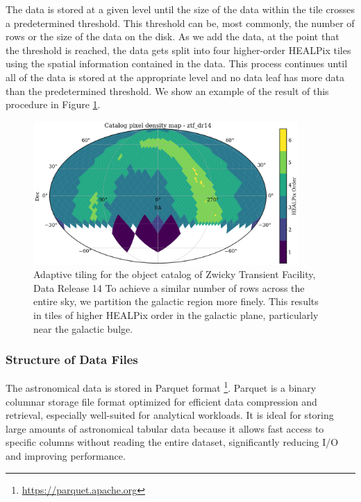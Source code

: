 \documentclass[11pt,a4paper]{ivoa}
\begin{document}
The data is stored at a given level until the size of the data within the tile crosses a predetermined threshold. 
This threshold can be, most commonly, the number of rows or the size of the data on the disk. 
As we add the data, at the point that the threshold is reached, the data gets split into four higher-order HEALPix tiles using the spatial information contained in the data. 
This process continues until all of the data is stored at the appropriate level and no data leaf has more data than the predetermined threshold. We show an example of the result of this procedure in Figure \ref{fig:order}.

\begin{figure}
\centering
\includegraphics[width=0.9\textwidth]{order-pix.png}
\caption{Adaptive tiling for the object catalog of Zwicky Transient Facility, Data Release 14 \citep{ztf:Bellm2019, ztf:Masci2019} To achieve a similar number of rows across the entire sky, we partition the galactic region more finely. This results in tiles of higher HEALPix order in the galactic plane, particularly near the galactic bulge. }
\label{fig:order}
\end{figure}


\subsubsection{Structure of Data Files} \label{sec:parquet}
The astronomical data is stored in Parquet format \footnote{\href{https://parquet.apache.org}{https://parquet.apache.org}}.
Parquet is a binary columnar storage file format optimized for efficient data compression and retrieval, especially well-suited for analytical workloads. 
It is ideal for storing large amounts of astronomical tabular data because it allows fast access to specific columns without reading the entire dataset, significantly reducing I/O and improving performance. \par
\end{document}
